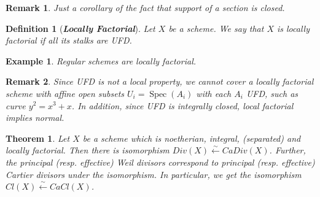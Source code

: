 \documentclass{ctexart}
\newtheorem{definition}{Definition}[section]
\newtheorem{remark}{Remark}[section]
\newtheorem{theorem}{Theorem}[section]
\newtheorem{example}{Example}[section]
\newcommand{\spec}{\operatorname{Spec}}
\begin{document}
\begin{remark}
    Just a corollary of the fact that support of a section is closed.
\end{remark}
\begin{definition}[\textbf{\emph{Locally Factorial}}]
    Let $X$ be a scheme.
    We say that $X$ is locally factorial if all its stalks are UFD.
\end{definition}
\begin{example}
    Regular schemes are locally factorial.
\end{example}
\begin{remark}
    Since UFD is not a local property, we cannot cover a locally factorial scheme with affine open subsets $U_{i} = \spec(A_{i})$ with each $A_{i}$ UFD, such as curve $y^{2} = x^{3} + x$.
    In addition, since UFD is integrally closed, local factorial implies normal.
\end{remark}
\begin{theorem}
    Let $X$ be a scheme which is noetherian, integral, (separated) and locally factorial.
    Then there is isomorphism $Div(X) \overset{\sim}{\longleftarrow} CaDiv(X)$.
    Further, the principal (resp. effective) Weil divisors correspond to principal (resp. effective) Cartier divisors under the isomorphism.
    In particular, we get the isomorphism $Cl(X) \overset{\sim}{\longleftarrow} CaCl(X)$.
    \label{Theorem 8.1}
\end{theorem}
\end{document}

